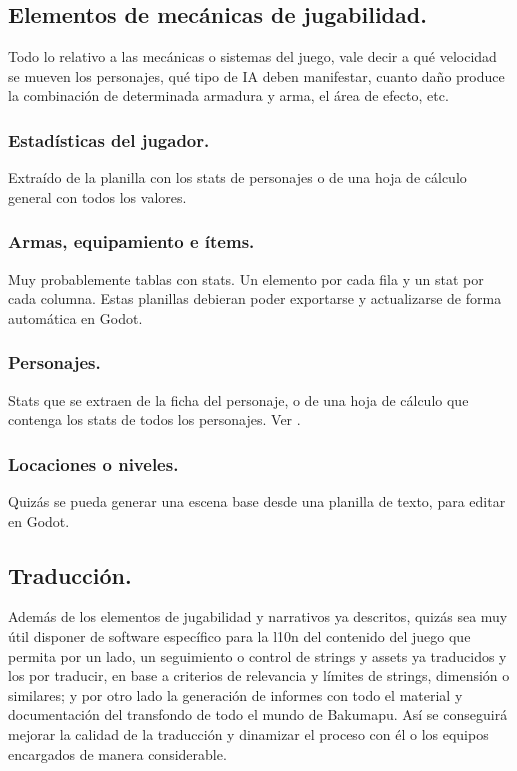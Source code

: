 \subsection{Elementos de mecánicas de jugabilidad.}\label{kit:elementos-de-mecanicas}
Todo lo relativo a las mecánicas o sistemas del juego, vale decir a qué velocidad se mueven los personajes, qué tipo de IA deben manifestar, cuanto daño produce la combinación de determinada armadura y arma, el área de efecto, etc.

\subsubsection{Estadísticas del jugador.}\label{kit:estadisticas-del-jugador}
Extraído de la planilla con los stats de personajes o de una hoja de cálculo general con todos los valores.

\subsubsection{Armas, equipamiento e ítems.}\label{kit:armas-equipamiento-items}
Muy probablemente tablas con stats. Un elemento por cada fila y un stat por cada columna. Estas planillas debieran poder exportarse y actualizarse de forma automática en Godot.

\subsubsection{Personajes.}\label{kit:personajes}
Stats que se extraen de la ficha del personaje, o de una hoja de cálculo que contenga los stats de todos los personajes. Ver .

\subsubsection{Locaciones o niveles.}\label{kit:locaciones-o-niveles}
Quizás se pueda generar una escena base desde una planilla de texto, para editar en Godot.

\subsection{Traducción.}\label{kit:traduccion}
Además de los elementos de jugabilidad y narrativos ya descritos, quizás sea muy útil disponer de software específico para la l10n del contenido del juego que permita por un lado, un seguimiento o control de strings y assets ya traducidos y los por traducir, en base a criterios de relevancia y límites de strings, dimensión o similares; y por otro lado la generación de informes con todo el material y documentación del transfondo de todo el mundo de Bakumapu. Así se conseguirá mejorar la calidad de la traducción y dinamizar el proceso con él o los equipos encargados de manera considerable.

